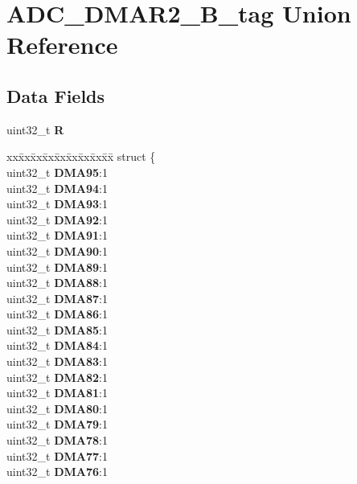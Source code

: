 \hypertarget{unionADC__DMAR2__32B__tag}{}\section{A\+D\+C\+\_\+\+D\+M\+A\+R2\+\_\+B\+\_\+tag Union Reference}
\label{unionADC__DMAR2__32B__tag}
\subsection*{Data Fields}
\begin{DoxyCompactItemize}
\item 
\mbox{\label{unionADC__DMAR2__32B__tag_a112788bca8171d4881bc3c30320bb8e1}} 
uint32\+\_\+t {\bfseries R}
\item 
\mbox{\label{unionADC__DMAR2__32B__tag_abfa9e431922016801551324fed02db0a}} 
\begin{tabbing}
xx\=xx\=xx\=xx\=xx\=xx\=xx\=xx\=xx\=\kill
struct \{\\
\>uint32\_t {\bfseries DMA95}:1\\
\>uint32\_t {\bfseries DMA94}:1\\
\>uint32\_t {\bfseries DMA93}:1\\
\>uint32\_t {\bfseries DMA92}:1\\
\>uint32\_t {\bfseries DMA91}:1\\
\>uint32\_t {\bfseries DMA90}:1\\
\>uint32\_t {\bfseries DMA89}:1\\
\>uint32\_t {\bfseries DMA88}:1\\
\>uint32\_t {\bfseries DMA87}:1\\
\>uint32\_t {\bfseries DMA86}:1\\
\>uint32\_t {\bfseries DMA85}:1\\
\>uint32\_t {\bfseries DMA84}:1\\
\>uint32\_t {\bfseries DMA83}:1\\
\>uint32\_t {\bfseries DMA82}:1\\
\>uint32\_t {\bfseries DMA81}:1\\
\>uint32\_t {\bfseries DMA80}:1\\
\>uint32\_t {\bfseries DMA79}:1\\
\>uint32\_t {\bfseries DMA78}:1\\
\>uint32\_t {\bfseries DMA77}:1\\
\>uint32\_t {\bfseries DMA76}:1\\

\end{tabbing}
\end{DoxyCompactItemize}
